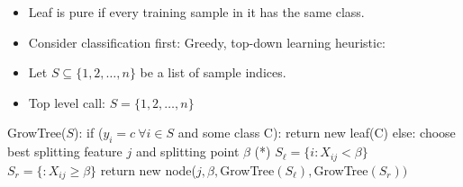 \documentclass[10pt]{article}
\begin{document}
\begin{itemize}
\begin{itemize}
\begin{center}
				\end{center}
			\end{itemize}
		\item Leaf is pure if every training sample in it has the same class.
		\item Consider classification first: Greedy, top-down learning heuristic: 
		\item Let $S \subseteq \{1, 2, \dots, n\}$ be a list of sample indices.
		\item Top level call: $S = \{1, 2, \dots, n\}$
		\end{itemize}
\begin{codeblock}
	GrowTree($S$):
	    if ($y_{i} = c \ \forall i \in S$ and some class C):
	        return new leaf(C)
	    else:
	        choose best splitting feature $j$ and splitting point $\beta$ (*)
	        $S_{\ell} = \{i : X_{ij} < \beta \}$
	        $S_{r} = \{ : X_{ij} \geq \beta \}$
	        return new node($j, \beta, $GrowTree$(S_{\ell}), $GrowTree$(S_{r}))$
\end{codeblock}
\end{document}

